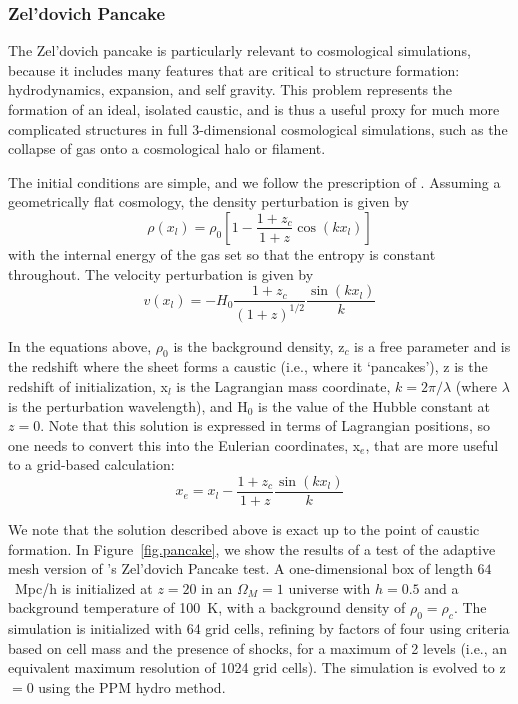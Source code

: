 \subsubsection{Zel'dovich Pancake}
\label{sec.tests.pancake}

The Zel'dovich pancake \citep{1970A&A.....5...84Z} is particularly
relevant to cosmological simulations, because it includes many
features that are critical to structure formation: hydrodynamics,
expansion, and self gravity.  This problem represents the formation of an ideal,
isolated caustic, and is thus a useful proxy for much more
complicated structures in full 3-dimensional cosmological simulations,
such as the collapse of gas onto a cosmological halo or filament.

The initial conditions are simple, and we follow the prescription of
\citet{Anninos94}.  Assuming a geometrically flat cosmology, the density
perturbation is given by
\begin{equation}
\rho(x_l) = \rho_0 \left[ 1 - \frac{1+z_c}{1+z} \cos(k x_l) \right]
\end{equation}
with the internal energy of the gas set so that the entropy 
is constant throughout.  The velocity perturbation is given by
\begin{equation}
v(x_l) = -H_0 \frac{1 + z_c}{(1+z)^{1/2}} \frac{\sin(k x_l)}{k}
\end{equation}

In the equations above, $\rho_0$ is the background density, z$_c$ is a
free parameter and is the redshift where the sheet forms a caustic
(i.e., where it `pancakes'), z is the redshift of initialization, x$_l$ is the
Lagrangian mass coordinate, $k = 2 \pi / \lambda$ (where $\lambda$ is
the perturbation wavelength), and H$_0$ is the value of the Hubble
constant at $z = 0$.  Note that this solution is expressed in terms of 
Lagrangian positions, so one needs to convert this into the Eulerian
coordinates, x$_e$, that are more useful to a grid-based calculation:
\begin{equation}
x_e = x_l - \frac{1 + z_c}{1 + z} \frac{\sin(k x_l)}{k}
\end{equation}

We note that the solution described above is exact up to the point of
caustic formation.  In Figure~\ref{fig.pancake}, we show the results
of a test of the adaptive mesh version of \enzo's Zel'dovich Pancake
test.  A one-dimensional box of length $64$~Mpc/h is initialized at $z
= 20$ in an $\Omega_M = 1$ universe with $h = 0.5$ and a background
temperature of 100~K, with a background density of $\rho_0 = \rho_c$.
The simulation is initialized with 64 grid cells, refining by factors
of four using criteria based on cell mass and the presence of shocks,
for a maximum of 2 levels (i.e., an equivalent maximum resolution of
1024 grid cells).  The simulation is evolved to z$ = 0$ using the PPM
hydro method.

